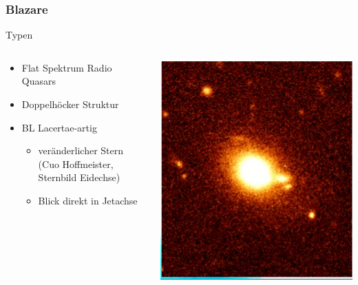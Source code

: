 \documentclass[aspectratio=1610, 9pt]{beamer}
\begin{document}
\begin{frame}\frametitle{Blazare}
  \begin{block}{Typen}
  \begin{columns}
  \begin{column}[c]{0.45\linewidth}
    \begin{itemize}
      \item Flat Spektrum Radio Quasars
      \item Doppelh\"ocker Struktur
      \item BL Lacertae-artig
      \begin{itemize}
        \item ver\"anderlicher Stern (Cuo Hoffmeister, Sternbild Eidechse)
        \item Blick direkt in Jetachse
      \end{itemize}
    \end{itemize}
    \end{column}
    \begin{column}[c]{0.45\linewidth}
      \includegraphics{images/bl-lac-object.png}
    \end{column}
    \end{columns}
  \end{block}
\end{frame}
\end{document}
